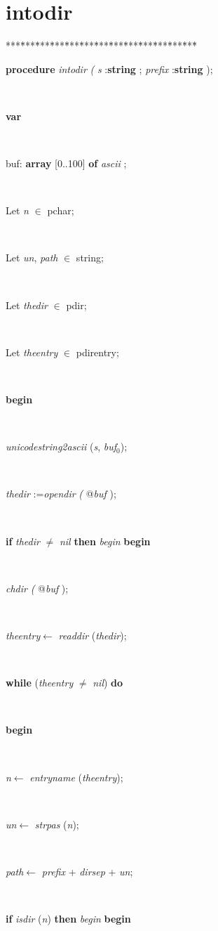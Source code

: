 \documentclass[10pt, a4paper]{article}
\begin{document}
\section{intodir}\label{sec:indexfilesintodir}

\begin{tabbing}
***\=***\=***\=***\=***\=***\=***\=***\=***\=***\=***\=***\=***\=\kill
\parbox{14cm}{\textsf{\textbf{procedure}  \textit{intodir} \textit{(} \textit{s} :\textbf{string} ; \textit{prefix} :\textbf{string} );}}\\
\+\parbox{14cm}{\textsf{\textbf{var} }}\\
\parbox{14cm}{buf: \textbf{ array } \textsf{[0..100] } \textbf{ of } \textsf{ \textit{ascii} ;}}\\
\parbox{14cm}{\textsf{Let \textit{n} $\in$ pchar;}}\\
\parbox{14cm}{\textsf{Let \textit{un}, \textit{path} $\in$ string;}}\\
\parbox{14cm}{\textsf{Let \textit{thedir} $\in$ pdir;}}\\
\parbox{14cm}{\textsf{Let \textit{theentry} $\in$ pdirentry;}}\\
\-\<\+\parbox{14cm}{\textsf{\textbf{begin} }}\\
\parbox{14cm}{\textsf{\textit{unicodestring2ascii} (\textit{s}, \textit{buf}$_{0}$)}; }\\
\parbox{14cm}{\textsf{\textit{thedir} :=\textit{opendir} \textit{(} @\textit{buf} );}}\\
\+\<\parbox{14cm}{\textsf {\textbf {if } \textsf{\textit{thedir} $\neq$ \textit{nil}} \textbf{ then } \textsf{\textit{begin}} \textbf{ begin } }}\\
\parbox{14cm}{\textsf{\textit{chdir} \textit{(} @\textit{buf} );}}\\
\parbox{14cm}{\textsf{\textit{theentry}$\leftarrow$ \textit{readdir} (\textit{thedir})}; }\\
\+\parbox{14cm}{\textsf {\textbf {while } \textsf{(\textit{theentry} $\neq$ \textit{nil})} \textbf{ do } }}\\
\<\parbox{14cm}{\textsf{\textbf{begin} }}\\
\parbox{14cm}{\textsf{\textit{n}$\leftarrow$ \textit{entryname} (\textit{theentry})}; }\\
\parbox{14cm}{\textsf{\textit{un}$\leftarrow$ \textit{strpas} (\textit{n})}; }\\
\parbox{14cm}{\textsf{\textit{path}$\leftarrow$ \textit{prefix} + \textit{dirsep} + \textit{un}}; }\\
\+\<\parbox{14cm}{\textsf {\textbf {if } \textsf{\textit{isdir} (\textit{n})} \textbf{ then } \textsf{\textit{begin}} \textbf{ begin } }}\\

\end{tabbing}
\end{document}
